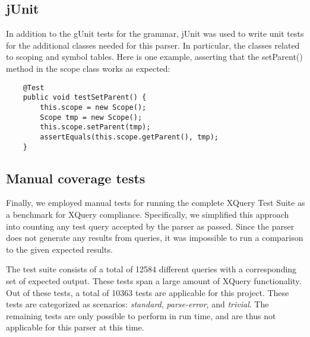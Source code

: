 \subsection{jUnit}
In addition to the gUnit tests for the grammar, jUnit was used to write unit tests for
the additional classes needed for this parser. In particular, the classes
related to scoping and symbol tables. Here is one example, asserting that the
setParent() method in the scope class works as expected:
\begin{Verbatim}
    @Test
    public void testSetParent() {
        this.scope = new Scope();
        Scope tmp = new Scope();
        this.scope.setParent(tmp);
        assertEquals(this.scope.getParent(), tmp);
    }
\end{Verbatim}

\subsection{Manual coverage tests}
Finally, we employed manual tests for running the complete XQuery Test Suite\cite{w3c05}
as a benchmark for XQuery compliance. Specifically, we simplified this approach
into counting any test query accepted by the parser as passed. Since the parser
does not generate any results from queries, it was impossible to run a
comparison to the given expected results.

The test suite consists of a total of 12584 different queries with a
corresponding set of expected output. These tests span a large amount of XQuery
functionality. Out of these tests, a total of 10363 tests are applicable for
this project. These tests are categorized as scenarios: \emph{standard}, 
\emph{parse-error}, and \emph{trivial}. The remaining tests are only possible to
perform in run time, and are thus not applicable for this parser at this time.